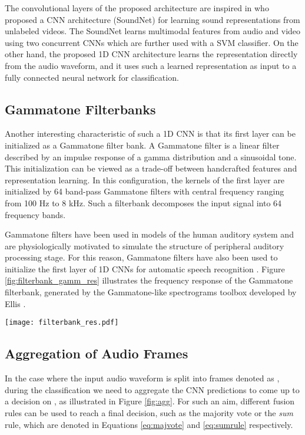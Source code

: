 \documentclass[preprint,final,12pt]{elsarticle}
\begin{document}
The convolutional layers of the proposed architecture are inspired in \citet{aytar2016soundnet} who proposed a CNN architecture (SoundNet) for learning sound representations from unlabeled videos. The SoundNet \citep{aytar2016soundnet} learns multimodal features from audio and video using two concurrent CNNs which are further used with a SVM classifier. On the other hand, the proposed 1D CNN architecture learns the representation directly from the audio waveform, and it uses such a learned representation as input to a fully connected neural network for classification.

\subsection{Gammatone Filterbanks}
\label{sub:gamma}
Another interesting characteristic of such a 1D CNN is that its first layer can be initialized as a Gammatone filter bank. A Gammatone filter is a linear filter described by an impulse response of a gamma distribution and a sinusoidal tone. This initialization can be viewed as a trade-off between handcrafted features and representation learning. In this configuration, the kernels of the first layer are initialized by 64 band-pass Gammatone filters with central frequency ranging from 100 Hz to 8 kHz. Such a filterbank decomposes the input signal into 64 frequency bands.

Gammatone filters have been used in models of the human auditory system and are physiologically motivated to simulate the structure of peripheral auditory processing stage. For this reason, Gammatone filters have also been used to initialize the first layer of 1D CNNs for automatic speech recognition \citep{hoshen2015speech,Zeghidour2018,sainath2015learning}. Figure \ref{fig:filterbank_gamm_res} illustrates the frequency response of the Gammatone filterbank, generated by the Gammatone-like spectrograms toolbox developed by Ellis \citep{ellistoolbox:2009}.

\begin{figure*}[htpb!]
  \centering
  \texttt{[image: filterbank\_res.pdf]}
  \caption{Frequency response of 64 filters of Gammatone filterbank.}
  \label{fig:filterbank_gamm_res}
\end{figure*}



\subsection{Aggregation of Audio Frames}
\label{sub:agg}
In the case where the input audio waveform  is split into  frames denoted as , during the classification we need to aggregate the CNN predictions to come up to a decision on , as illustrated in Figure \ref{fig:agg}. For such an aim, different fusion rules can be used to reach a final decision, such as the majority vote or the \textit{sum} rule, which are denoted in Equations \ref{eq:majvote} and \ref{eq:sumrule} respectively.
\end{document}
